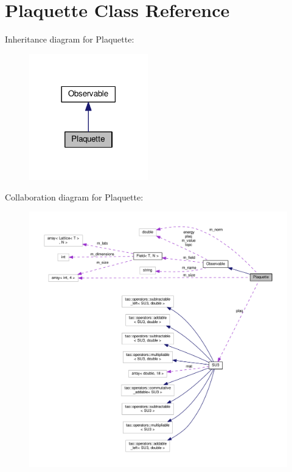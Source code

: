 \hypertarget{classPlaquette}{}\section{Plaquette Class Reference}
\label{classPlaquette}


Inheritance diagram for Plaquette\+:\nopagebreak
\begin{figure}[H]
\begin{center}
\leavevmode
\includegraphics[width=146pt]{db/d05/classPlaquette__inherit__graph}
\end{center}
\end{figure}


Collaboration diagram for Plaquette\+:\nopagebreak
\begin{figure}[H]
\begin{center}
\leavevmode
\includegraphics[width=350pt]{d0/d3a/classPlaquette__coll__graph}
\end{center}
\end{figure}
